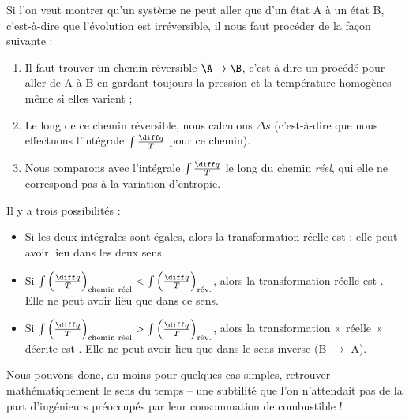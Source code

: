 		Si l’on veut montrer qu’un système ne peut aller que d’un état A à un état B, c’est-à-dire que l’évolution est irréversible, il nous faut procéder de la façon suivante :
	
		\begin{enumerate}
			\item Il faut trouver un chemin réversible $\A \to \B$, c’est-à-dire un procédé pour aller de A à B en gardant toujours la pression et la température homogènes même si elles varient ;
			\item Le long de ce chemin réversible, nous calculons $\Delta s$ (c’est-à-dire que nous effectuons l’intégrale $\int \frac{\diff q}{T} $ pour ce chemin).
			\item Nous comparons avec l’intégrale $\int \frac{\diff q}{T} $ le long du chemin \emph{réel}, qui elle ne correspond pas à la variation d’entropie.
		\end{enumerate}

		Il y a trois possibilités :
			\begin{itemize}
				\item Si les deux intégrales sont égales, alors la transformation réelle est  : elle peut avoir lieu dans les deux sens.
				\item Si $\int \left(\frac{\diff q}{T}\right)_\text{chemin réel} < \int \left(\frac{\diff q}{T}\right)_\text{rév.}$, alors la transformation réelle est . Elle ne peut avoir lieu que dans ce sens.
				\item Si $\int \left(\frac{\diff q}{T}\right)_\text{chemin réel} > \int \left(\frac{\diff q}{T}\right)_\text{rév.}$, alors la transformation «~réelle~» décrite est . Elle ne peut avoir lieu que dans le sens inverse (B $\to$ A). 
			\end{itemize}
		
		Nous pouvons donc, au moins pour quelques cas simples, retrouver mathématiquement le sens du temps -- une subtilité que l’on n’attendait pas de la part d’ingénieurs préoccupés par leur consommation de combustible !

